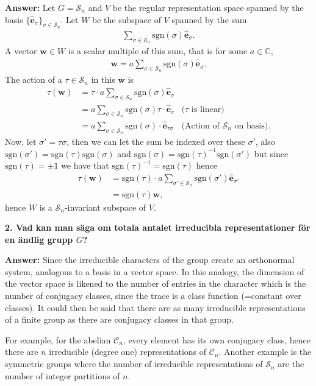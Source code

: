\documentclass[12pt,a4paper]{article}
\theoremstyle{definition}
\theoremstyle{remark}
\numberwithin{equation}{section}
\newcommand{\CC}{\mathbb{C}}
\newcommand{\1}{\mathbf{1}}
\newcommand{\0}{\mathbf{0}}
\newcommand{\Sym}{\mathcal{S}} %
\newcommand{\Cyc}{\mathcal{C}}%
\newcommand{\sgn}{\text{sgn}}
\newcommand{\bas}{\mathbf{\hat{e}}}
\newcommand{\wvec}{\mathbf{w}}
\begin{document}
			\textbf{Answer:} Let $G = \Sym_n$ and $V$ be the regular representation space spanned by the basis $\{\bas_\sigma\}_{\sigma \in \Sym_n}$. Let $W$ be the subspace of $V$ spanned by the sum
			\begin{align*}
				\sum_{\sigma \in \Sym_n} \sgn(\sigma) \bas_\sigma.
			\end{align*}
			A vector $\wvec \in W$ is a scalar multiple of this sum, that is for some $a \in \CC$,
			\begin{align*}
				\wvec = a \sum_{\sigma \in \Sym_n} \sgn(\sigma) \bas_\sigma.
			\end{align*}
			The action of a $\tau \in \Sym_n$ in this $\wvec$ is
			\begin{align*}
				\tau(\wvec) &= \tau \cdot a \sum_{\sigma \in \Sym_n} \sgn(\sigma) \bas_\sigma \\
				&= a \sum_{\sigma \in \Sym_n} \sgn(\sigma) \tau \cdot \bas_\sigma & \text{($\tau$ is linear)} \\
				&= a \sum_{\sigma \in \Sym_n} \sgn(\sigma) \cdot \bas_{\tau\sigma} & \text{(Action of $\Sym_n$ on basis)}.
			\end{align*}
			Now, let $\sigma' = \tau\sigma$, then we can let the sum be indexed over these $\sigma'$, also $\sgn(\sigma') = \sgn(\tau)\sgn(\sigma)$ and $\sgn(\sigma) = \sgn(\tau)^{-1}\sgn(\sigma')$ but since $\sgn(\tau) = \pm 1$ we have that $\sgn(\tau)^{-1} = \sgn(\tau)$ hence
			\begin{align*}
				\tau(\wvec) &= \sgn(\tau) \cdot a \sum_{\sigma' \in \Sym_n} \sgn(\sigma') \bas_{\sigma'} \\
				&= \sgn(\tau)\wvec,
			\end{align*}
			hence $W$ is a $\Sym_n$-invariant subspace of $V$.
		
		\textbf{2. Vad kan man säga om totala antalet irreducibla representationer för en ändlig grupp $G$?}
			
			\textbf{Answer:} Since the irreducible characters of the group create an orthonormal system, analogous to a basis in a vector space. In this analogy, the dimension of the vector space is likened to the number of entries in the character which is the number of conjugacy classes, since the trace is a class function (=constant over classes). It could then be said that there are as many irreducible representations of a finite group as there are conjugacy classes in that group. 
			
			For example, for the abelian $\Cyc_n$, every element has its own conjugacy class, hence there are $n$ irreducible (degree one) representations of $\Cyc_n$. Another example is the symmetric groups where the number of irreducible representations of $\Sym_n$ are the number of integer partitions of $n$.
			
\end{document}
